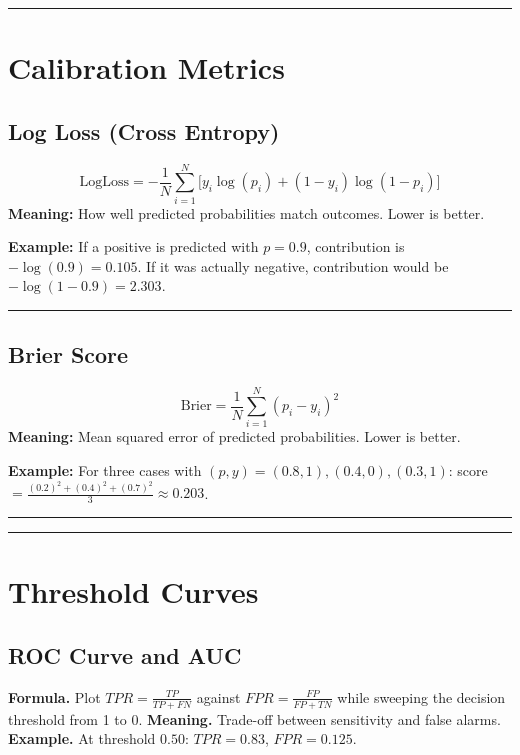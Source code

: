 \documentclass[a4paper,11pt]{article}
\newcommand{\exline}{\vspace{0.35em}\hrule\vspace{0.6em}}
\newcommand{\metric}[4]{%
\subsection*{#1}
\[
#2
\]
\noindent\textbf{Meaning:} #3

\vspace{0.8em}

\noindent\textbf{Example:} #4

\exline
}
\begin{document}
\exline

\section{Calibration Metrics}

\metric{Log Loss (Cross Entropy)}{\displaystyle \text{LogLoss}=-\frac{1}{N}\sum_{i=1}^{N}\Big[y_i\log(p_i)+(1-y_i)\log(1-p_i)\Big]}{How well predicted probabilities match outcomes. Lower is better.}{If a positive is predicted with \(p=0.9\), contribution is \(-\log(0.9)=0.105\). If it was actually negative, contribution would be \(-\log(1-0.9)=2.303\).}

\metric{Brier Score}{\displaystyle \text{Brier}=\frac{1}{N}\sum_{i=1}^N (p_i-y_i)^2}{Mean squared error of predicted probabilities. Lower is better.}{For three cases with \((p,y)=(0.8,1),(0.4,0),(0.3,1)\): score \(=\frac{(0.2)^2+(0.4)^2+(0.7)^2}{3}\approx 0.203\).}

\exline

\section{Threshold Curves}

\subsection*{ROC Curve and AUC}
\textbf{Formula.} Plot \(TPR=\frac{TP}{TP+FN}\) against \(FPR=\frac{FP}{FP+TN}\) while sweeping the decision threshold from 1 to 0.  
\textbf{Meaning.} Trade-off between sensitivity and false alarms.  
\textbf{Example.} At threshold \(0.50\): \(TPR=0.83\), \(FPR=0.125\).

\begin{center}
\end{center}
\end{document}
